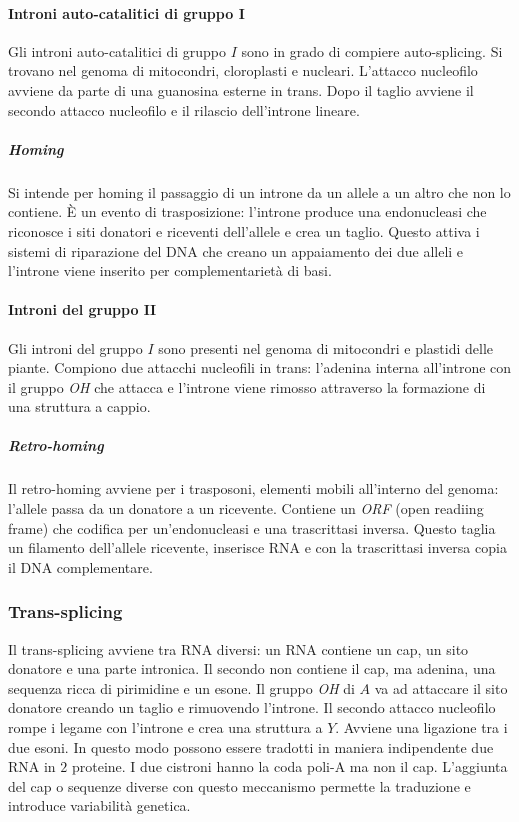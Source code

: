 			\paragraph{Introni auto-catalitici di gruppo $\mathbf{I}$}
			Gli introni auto-catalitici di gruppo $I$ sono in grado di compiere auto-splicing.
			Si trovano nel genoma di mitocondri, cloroplasti e nucleari.
			L'attacco nucleofilo avviene da parte di una guanosina esterne in trans.
			Dopo il taglio avviene il secondo attacco nucleofilo e il rilascio dell'introne lineare.

				\subparagraph{Homing}
				Si intende per homing il passaggio di un introne da un allele a un altro che non lo contiene.
				\`E un evento di trasposizione: l'introne produce una endonucleasi che riconosce i siti donatori e riceventi dell'allele e crea un taglio.
				Questo attiva i sistemi di riparazione del DNA che creano un appaiamento dei due alleli e l'introne viene inserito per complementariet\`a di basi.

			\paragraph{Introni del gruppo $\mathbf{II}$}
			Gli introni del gruppo $I$ sono presenti nel genoma di mitocondri e plastidi delle piante.
			Compiono due attacchi nucleofili in trans: l'adenina interna all'introne con il gruppo \emph{OH} che attacca e l'introne viene rimosso attraverso la formazione di una struttura a cappio.

				\subparagraph{Retro-homing}
				Il retro-homing avviene per i trasposoni, elementi mobili all'interno del genoma: l'allele passa da un donatore a un ricevente.
				Contiene un \emph{ORF} (open readiing frame) che codifica per un'endonucleasi e una trascrittasi inversa.
				Questo taglia un filamento dell'allele ricevente, inserisce RNA e con la trascrittasi inversa copia il DNA complementare.

		\subsubsection{Trans-splicing}
		Il trans-splicing avviene tra RNA diversi: un RNA contiene un cap, un sito donatore e una parte intronica.
		Il secondo non contiene il cap, ma adenina, una sequenza ricca di pirimidine e un esone.
		Il gruppo \emph{OH} di $A$ va ad attaccare il sito donatore creando un taglio e rimuovendo l'introne.
		Il secondo attacco nucleofilo rompe i legame con l'introne e crea una struttura a $Y$.
		Avviene una ligazione tra i due esoni.
		In questo modo possono essere tradotti in maniera indipendente due RNA in $2$ proteine.
		I due cistroni hanno la coda poli-A ma non il cap.
		L'aggiunta del cap o sequenze diverse con questo meccanismo permette la traduzione e introduce variabilit\`a genetica.

